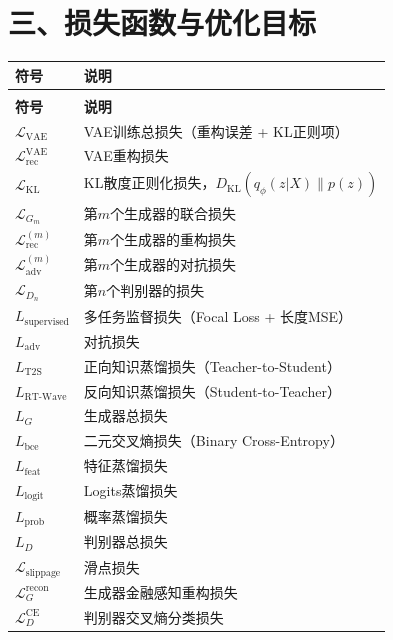 \section*{三、损失函数与优化目标}

\begin{longtable}{>{\raggedright\arraybackslash}p{4cm} p{10cm}}
\toprule
\textbf{符号} & \textbf{说明} \\
\midrule
\endfirsthead
\multicolumn{2}{c}{\tablename\ -- 续表} \\
\toprule
\textbf{符号} & \textbf{说明} \\
\midrule
\endhead
\bottomrule
\endlastfoot

$\mathcal{L}_{\text{VAE}}$ & VAE训练总损失（重构误差 + KL正则项） \\
$\mathcal{L}_{\text{rec}}^{\text{VAE}}$ & VAE重构损失 \\
$\mathcal{L}_{\text{KL}}$ & KL散度正则化损失，$D_{\mathrm{KL}}(q_\phi(z|X) \| p(z))$ \\
$\mathcal{L}_{G_m}$ & 第$m$个生成器的联合损失 \\
$\mathcal{L}_{\text{rec}}^{(m)}$ & 第$m$个生成器的重构损失 \\
$\mathcal{L}_{\text{adv}}^{(m)}$ & 第$m$个生成器的对抗损失 \\
$\mathcal{L}_{D_n}$ & 第$n$个判别器的损失 \\
$L_{\text{supervised}}$ & 多任务监督损失（Focal Loss + 长度MSE） \\
$L_{\text{adv}}$ & 对抗损失 \\
$L_{\text{T2S}}$ & 正向知识蒸馏损失（Teacher-to-Student） \\
$L_{\text{RT-Wave}}$ & 反向知识蒸馏损失（Student-to-Teacher） \\
$L_G$ & 生成器总损失 \\
$L_{\text{bce}}$ & 二元交叉熵损失（Binary Cross-Entropy） \\
$L_{\text{feat}}$ & 特征蒸馏损失 \\
$L_{\text{logit}}$ & Logits蒸馏损失 \\
$L_{\text{prob}}$ & 概率蒸馏损失 \\
$L_D$ & 判别器总损失 \\
$\mathcal{L}_{\text{slippage}}$ & 滑点损失 \\
$\mathcal{L}_{G}^{\text{recon}}$ & 生成器金融感知重构损失 \\
$\mathcal{L}_{D}^{\text{CE}}$ & 判别器交叉熵分类损失 \\

\end{longtable}
